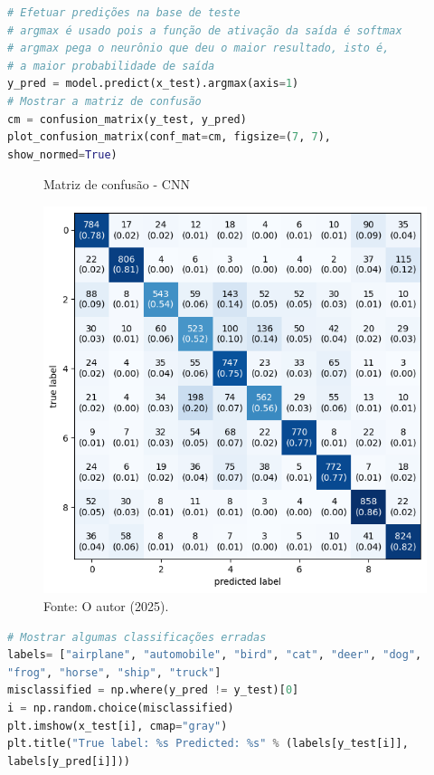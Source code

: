 \begin{lstlisting}[language=Python, style=input]
# Efetuar predições na base de teste
# argmax é usado pois a função de ativação da saída é softmax
# argmax pega o neurônio que deu o maior resultado, isto é,
# a maior probabilidade de saída
y_pred = model.predict(x_test).argmax(axis=1)
# Mostrar a matriz de confusão
cm = confusion_matrix(y_test, y_pred)
plot_confusion_matrix(conf_mat=cm, figsize=(7, 7),
show_normed=True)
\end{lstlisting}

\begin{figure}[H]
\centering
\caption{Matriz de confusão - CNN}
\includegraphics[width=.8\linewidth]{apendices/fig/9_IAA009_3.png}
\caption*{Fonte: O autor (2025).}
\end{figure}

\begin{lstlisting}[language=Python, style=input]
# Mostrar algumas classificações erradas
labels= ["airplane", "automobile", "bird", "cat", "deer", "dog",
"frog", "horse", "ship", "truck"]
misclassified = np.where(y_pred != y_test)[0]
i = np.random.choice(misclassified)
plt.imshow(x_test[i], cmap="gray")
plt.title("True label: %s Predicted: %s" % (labels[y_test[i]],
labels[y_pred[i]]))
\end{lstlisting}

